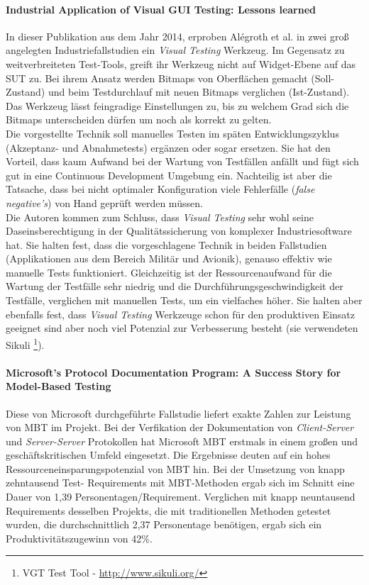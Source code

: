 \paragraph{Industrial Application of Visual GUI Testing: Lessons learned \cite{alegroth_industrial_2014}}In dieser Publikation aus dem Jahr 2014, erproben Alégroth et al. in zwei groß angelegten Industriefallstudien ein \textit{Visual Testing} Werkzeug. Im Gegensatz zu weitverbreiteten Test-Tools, greift ihr Werkzeug nicht auf Widget-Ebene auf das SUT zu. Bei ihrem Ansatz werden Bitmaps von Oberflächen gemacht (Soll-Zustand) und beim Testdurchlauf mit neuen Bitmaps verglichen (Ist-Zustand). Das Werkzeug lässt feingradige Einstellungen zu, bis zu welchem Grad sich die Bitmaps unterscheiden dürfen um noch als korrekt zu gelten.\\
Die vorgestellte Technik soll manuelles Testen im späten Entwicklungszyklus (Akzeptanz- und Abnahmetests) ergänzen oder sogar ersetzen. Sie hat den Vorteil, dass kaum Aufwand bei der Wartung von Testfällen anfällt und fügt sich gut in eine Continuous Development Umgebung ein. Nachteilig ist aber die Tatsache, dass bei nicht optimaler Konfiguration viele Fehlerfälle (\textit{false negative's}) von Hand geprüft werden müssen.\\
Die Autoren kommen zum Schluss, dass \textit{Visual Testing} sehr wohl seine Daseinsberechtigung in der Qualitätssicherung von komplexer Industriesoftware hat. Sie halten fest, dass die vorgeschlagene Technik in beiden Fallstudien (Applikationen aus dem Bereich Militär und Avionik), genauso effektiv wie manuelle Tests funktioniert. Gleichzeitig ist der Ressourcenaufwand für die Wartung der Testfälle sehr niedrig und die Durchführungsgeschwindigkeit der Testfälle, verglichen mit manuellen Tests, um ein vielfaches höher. Sie halten aber ebenfalls fest, dass \textit{Visual Testing} Werkzeuge schon für den produktiven Einsatz geeignet sind aber noch viel Potenzial zur Verbesserung besteht (sie verwendeten Sikuli \footnote{VGT Test Tool - \url{http://www.sikuli.org/}}).

\paragraph{Microsoft’s Protocol Documentation Program: A Success Story for Model-Based Testing\cite{grieskamp_microsofts_2010}}\label{sec:microsoft_fallstudie}
Diese von Microsoft durchgeführte Fallstudie liefert exakte Zahlen zur Leistung von MBT im Projekt. Bei der Verfikation der Dokumentation von \textit{Client-Server} und \textit{Server-Server} Protokollen hat Microsoft MBT erstmals in einem großen und geschäftskritischen Umfeld eingesetzt. Die Ergebnisse deuten auf ein hohes Ressourceneinsparungspotenzial von MBT hin. Bei der Umsetzung von knapp zehntausend Test- Requirements mit MBT-Methoden ergab sich im Schnitt eine Dauer von 1,39 Personentagen/Requirement. Verglichen mit knapp neuntausend Requirements desselben Projekts, die mit traditionellen Methoden getestet wurden, die durchschnittlich 2,37 Personentage benötigen, ergab sich ein Produktivitätszugewinn von 42\%.

